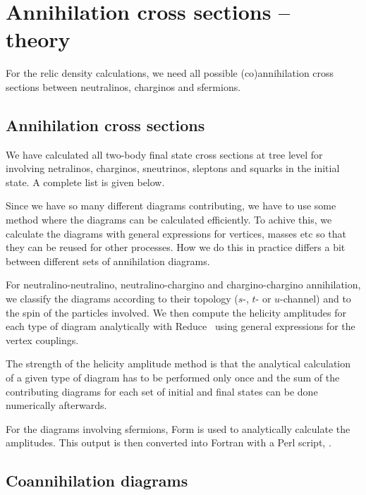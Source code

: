 
\section{Annihilation cross sections -- theory }

For the relic density calculations, we need all possible
(co)annihilation cross sections between neutralinos, charginos and
sfermions.


\subsection{Annihilation cross sections}
\label{sec:AnnCross}

We have calculated all two-body final state cross sections at tree
level for involving netralinos, charginos, sneutrinos, sleptons and 
squarks in the initial state. A complete list is given below.

Since we have so many different diagrams contributing, we have to use 
some method where the diagrams can be calculated efficiently. To
achive this, we calculate the diagrams with general expressions for
vertices, masses etc so that they can be reused for other
processes. How we do this in practice differs a bit between different
sets of annihilation diagrams.

For neutralino-neutralino, neutralino-chargino and chargino-chargino
annihilation, we 
classify the diagrams according to their topology ($s$-, 
$t$- or $u$-channel) and to the spin of the particles involved.  We 
then compute the helicity amplitudes for each type of diagram 
analytically with {\sc Reduce}~\cite{reduce} using general expressions 
for the vertex couplings.  

The strength of the helicity amplitude method is that the analytical
calculation of a given type of diagram has to be performed only once
and the sum of the contributing diagrams for each set of initial and
final states can be done numerically afterwards.

For the diagrams involving sfermions, {\sc Form}
is used to analytically calculate the amplitudes. This output is then converted
into Fortran with a {\sc Perl} script,  \cite{form2f}.

\subsection{Coannihilation diagrams}

